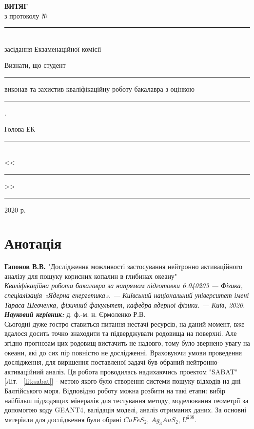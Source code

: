 \documentclass[a4paper, 14pt]{article}
\numberwithin{equation}{section}
\numberwithin{table}{section}
\begin{document}
\begin{titlepage}
	\renewcommand{\baselinestretch}{1.0}
	\newcommand{\ul}[1]{\rule{#1}{0.1pt}}
	\begin{spacing}{1.8}
		\vspace*{4.5cm}
		{\center
			{\bf ВИТЯГ}\\
			з протоколу № \ul{2.4cm}\\
			засідання Екзаменаційної комісії\\[2cm]}
		{\noindent
			Визнати, що студент \ul{7.2cm} виконав та захистив кваліфікаційну роботу бакалавра з оцінкою \ul{7.2cm} .\\[1cm]}
		{\flushright
			Голова ЕК \ul{7.8cm}\\
			<<\ul{1cm}>> \ul{4cm} 2020 р.\\}
	\end{spacing}
\end{titlepage}


\pagestyle{empty}
\section*{Анотація}

{\bf Гапонов В.В.} "Дослідження можливості застосування нейтронно активаційного аналізу для пошуку корисних копалин в глибинах океану"\\
{\itshape Кваліфікаційна робота бакалавра за напрямом підготовки 6.040203 --- Фізика, спеціалізація «Ядерна енергетика». --- Київський національний університет імені Тараса Шевченка, фізичний факультет, кафедра ядерної фізики. --- Київ, 2020.} \\
{\itshape \bfseries Науковий керівник:} д. ф.-м. н. Єрмоленко Р.В.%
\\[0.5cm]
Сьогодні дуже гостро ставиться питання нестачі ресурсів, на даний момент, вже вдалося досить точно знаходити та підверджувати родовища на поверхні. Але згідно прогнозам цих родовищ вистачить не надовго, тому було звернено увагу на океани, які до сих пір повністю не дослідженні. 
Враховуючи умови проведення дослідження, для вирішення поставленої задачі був обраний нейтронно-активаційний аналіз. Ця робота проводилась надихаючись проектом "SABAT" [Літ. ~\ref{lit:sabat}] - метою якого було створення системи пошуку відходів на дні Балтійського моря. Відповідно роботу можна розбити на такі етапи: вибір найбільш підходящих мінералів для тестування методу, моделювання геометрії за допомогою коду GEANT4, валідація моделі, аналіз отриманих даних. За основні матеріали для дослідження були обрані $CuFeS_2$, $Ag_3AuS_2$, $U^{238}$. 
\end{document}
